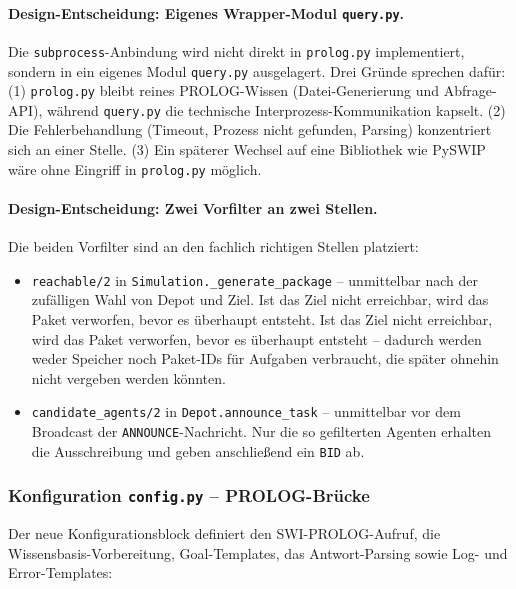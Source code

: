 \paragraph{Design-Entscheidung: Eigenes Wrapper-Modul \texttt{query.py}.}
Die \texttt{subprocess}-Anbindung wird nicht direkt in \texttt{prolog.py} implementiert, sondern in ein eigenes Modul \texttt{query.py} ausgelagert. Drei Gründe sprechen dafür: (1) \texttt{prolog.py} bleibt reines \acs{PROLOG}-Wissen (Datei-Generierung und Abfrage-API), während \texttt{query.py} die technische Interprozess-Kommunikation kapselt. (2) Die Fehlerbehandlung (Timeout, Prozess nicht gefunden, Parsing) konzentriert sich an einer Stelle. (3) Ein späterer Wechsel auf eine Bibliothek wie PySWIP wäre ohne Eingriff in \texttt{prolog.py} möglich.

\paragraph{Design-Entscheidung: Zwei Vorfilter an zwei Stellen.}
Die beiden Vorfilter sind an den fachlich richtigen Stellen platziert:
\begin{itemize}
    \item \texttt{reachable/2} in \texttt{Simulation.\_generate\_package} -- unmittelbar nach der zufälligen Wahl von Depot und Ziel. Ist das Ziel nicht erreichbar, wird das Paket verworfen, bevor es überhaupt entsteht. Ist das Ziel nicht erreichbar, wird das Paket verworfen, bevor es überhaupt entsteht -- dadurch werden weder Speicher noch Paket-IDs für Aufgaben verbraucht, die später ohnehin nicht vergeben werden könnten.
    \item \texttt{candidate\_agents/2} in \texttt{Depot.announce\_task} -- unmittelbar vor dem Broadcast der \texttt{ANNOUNCE}-Nachricht. Nur die so gefilterten Agenten erhalten die Ausschreibung und geben anschließend ein \texttt{BID} ab.
\end{itemize}


\subsubsection{Konfiguration \texttt{config.py} – \acs{PROLOG}-Brücke}

Der neue Konfigurationsblock definiert den \acs{SWI}-\acs{PROLOG}-Aufruf, die Wissensbasis-Vorbereitung, Goal-Templates, das Antwort-Parsing sowie Log- und Error-Templates:




